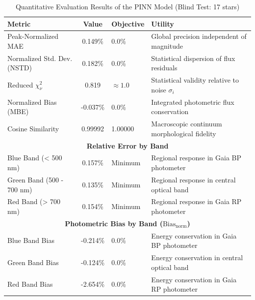 
\begin{table}[htpb]
\centering
\caption{Quantitative Evaluation Results of the PINN Model (Blind Test: 17 stars)}
\label{tab:pinn_evaluation}
\begin{tabular}{lcll}
\hline
\textbf{Metric} & \textbf{Value} & \textbf{Objective} & \textbf{Utility} \\
\hline
Peak-Normalized MAE & 0.149\% & 0.0\% & Global precision independent of magnitude \\
Normalized Std. Dev. (NSTD) & 0.182\% & 0.0\% & Statistical dispersion of flux residuals \\
Reduced $\chi^2_\nu$ & 0.819 & $\approx 1.0$ & Statistical validity relative to noise $\sigma_i$ \\
Normalized Bias (MBE) & -0.037\% & 0.0\% & Integrated photometric flux conservation \\
Cosine Similarity & 0.99992 & 1.00000 & Macroscopic continuum morphological fidelity \\
\hline
\multicolumn{4}{c}{\textbf{Relative Error by Band}} \\
\hline
Blue Band (< 500 nm) & 0.157\% & Minimum & Regional response in Gaia BP photometer \\
Green Band (500 - 700 nm) & 0.135\% & Minimum & Regional response in central optical band \\
Red Band (> 700 nm) & 0.154\% & Minimum & Regional response in Gaia RP photometer \\
\hline
\multicolumn{4}{c}{\textbf{Photometric Bias by Band ($\text{Bias}_{\text{norm}}$)}} \\
\hline
Blue Band Bias & -0.214\% & 0.0\% & Energy conservation in Gaia BP photometer \\
Green Band Bias & -0.124\% & 0.0\% & Energy conservation in central optical band \\
Red Band Bias & -2.654\% & 0.0\% & Energy conservation in Gaia RP photometer \\
\hline
\end{tabular}
\end{table}
